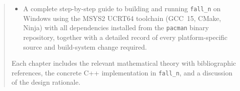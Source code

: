 \documentclass[11pt,a4paper]{report}
\theoremstyle{definition}
\begin{document}
\begin{abstract}
\begin{itemize}[nosep]
        (MaterialPolicy, KinematicPolicy, ElementPolicy), compile-time
        efficiency, and comparison with OpenSees and Kratos Multiphysics;
  \item A complete step-by-step guide to building and running \texttt{fall\_n}
        on Windows using the MSYS2 UCRT64 toolchain (GCC~15, CMake, Ninja)
        with all dependencies installed from the \texttt{pacman} binary
        repository, together with a detailed record of every platform-specific
        source and build-system change required.
\end{itemize}
Each chapter includes the relevant mathematical theory with bibliographic
references, the concrete C++ implementation in \texttt{fall\_n}, and a
discussion of the design rationale.
\end{abstract}

\tableofcontents
\end{document}
